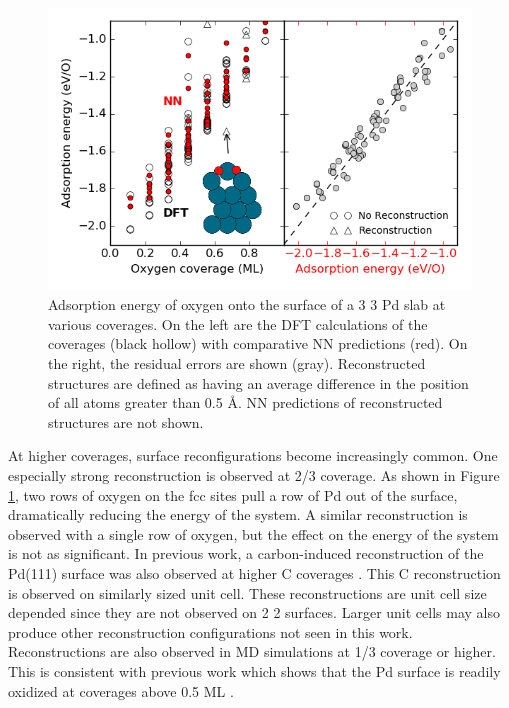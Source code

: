 \documentclass[12pt]{cmuthesis}
\begin{document}
\begin{figure}[htbp]
\centering
\includegraphics[width=5in]{./images/coverage-dependance.png}
\caption{\label{fig-PdO-thermo-coverage}
Adsorption energy of oxygen onto the surface of a 3 \texttimes{} 3 Pd slab at various coverages. On the left are the DFT calculations of the coverages (black hollow) with comparative NN predictions (red). On the right, the residual errors are shown (gray). Reconstructed structures are defined as having an average difference in the position of all atoms greater than 0.5 \AA{}. NN predictions of reconstructed structures are not shown.}
\end{figure}

At higher coverages, surface reconfigurations become increasingly common. One especially strong reconstruction is observed at 2/3 coverage. As shown in Figure \ref{fig-PdO-thermo-coverage}, two rows of oxygen on the fcc sites pull a row of Pd out of the surface, dramatically reducing the energy of the system. A similar reconstruction is observed with a single row of oxygen, but the effect on the energy of the system is not as significant. In previous work, a carbon-induced reconstruction of the Pd(111) surface was also observed at higher C coverages \cite{kitchin-2009-correl-cover}. This C reconstruction is observed on similarly sized unit cell. These reconstructions are unit cell size depended since they are not observed on 2 \texttimes{} 2 surfaces. Larger unit cells may also produce other reconstruction configurations not seen in this work. Reconstructions are also observed in MD simulations at 1/3 coverage or higher. This is consistent with previous work which shows that the Pd surface is readily oxidized at coverages above 0.5 ML \cite{lundgren-2002-two-dimen,todorova-2004-oxygen-overl}.
\end{document}

